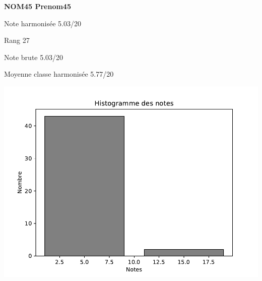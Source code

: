 \begin{minipage}[c]{.45\linewidth} 
\Large \textbf{\textsf{NOM45 Prenom45}} 
 
 \normalsize Note harmonisée 5.03/20 
 
Rang 27
 
Note brute 5.03/20 
 
Moyenne classe harmonisée 5.77/20 
 
\end{minipage}\hfill 
\begin{minipage}[c]{.45\linewidth}  
\begin{center}
\includegraphics[width=.8\linewidth]{../histo.pdf} 
\end{center}
\end{minipage}
\vspace{.cm}
\footnotesize 
